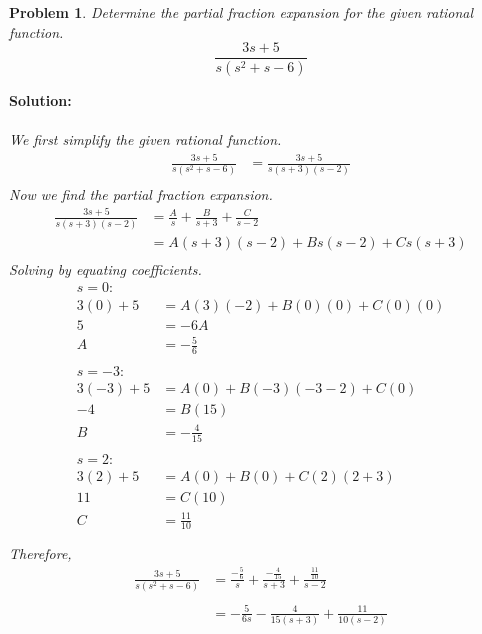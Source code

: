 \documentclass{article}
\newtheorem{problem}{Problem}
\begin{document}
    \newpage
    \begin{problem}
        Determine the partial fraction expansion for the given rational function. 
        \[
            \frac{3s + 5}{s(s^{2} + s - 6)}
        \]
    \end{problem}
    \textbf{Solution:} \\ \\
    \textit{We first simplify the given rational function.} \\
    \begin{align*}
     \frac{3s + 5}{s(s^{2} + s - 6)} &= \frac{3s + 5}{s(s + 3)(s - 2)} \\
    \end{align*}
    \textit{Now we find the partial fraction expansion.} \\
    \begin{align*}
        \frac{3s + 5}{s(s + 3)(s - 2)} &= \frac{A}{s} + \frac{B}{s + 3} + \frac{C}{s - 2} \\
        &= A(s + 3)(s - 2) + Bs(s - 2) + Cs(s + 3) \\
    \end{align*}
    \textit{Solving by equating coefficients.} \\
    \begin{align*}
        s = 0: \\
        3(0) + 5 &= A(3)(-2) + B(0)(0) + C(0)(0) \\
        5 &= -6A \\
        A &= -\frac{5}{6} \\ \\
        s = -3: \\
        3(-3) + 5 &= A(0) + B(-3)(-3 -2) + C(0) \\
        -4 &= B(15) \\
        B &= -\frac{4}{15} \\ \\
        s = 2: \\
        3(2) + 5 &= A(0) + B(0) + C(2)(2 + 3) \\
        11 &= C(10) \\
        C &= \frac{11}{10} \\ \\
    \end{align*}
    \textit{Therefore,} \\
    \begin{align*}
        \frac{3s + 5}{s(s^{2} + s - 6)} &= \frac{-\frac{5}{6}}{s} + \frac{-\frac{4}{15}}{s + 3} + \frac{\frac{11}{10}}{s - 2} \\ \\
        &= -\frac{5}{6s} - \frac{4}{15(s + 3)} + \frac{11}{10(s - 2)}
     \end{align*} 
    \newpage
\end{document}
